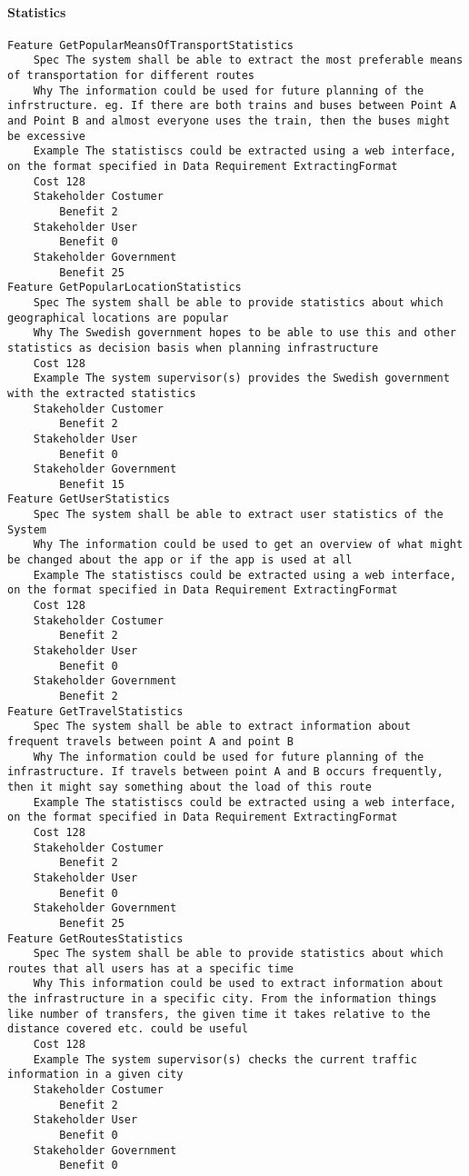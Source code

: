 \begin{lstlisting}

\end{lstlisting}


			 \paragraph{Statistics}


\begin{lstlisting}
Feature GetPopularMeansOfTransportStatistics
	Spec The system shall be able to extract the most preferable means of transportation for different routes
	Why The information could be used for future planning of the infrstructure. eg. If there are both trains and buses between Point A and Point B and almost everyone uses the train, then the buses might be excessive
	Example The statistiscs could be extracted using a web interface, on the format specified in Data Requirement ExtractingFormat
	Cost 128
	Stakeholder Costumer
		Benefit 2
	Stakeholder User
		Benefit 0
	Stakeholder Government
		Benefit 25
Feature GetPopularLocationStatistics
	Spec The system shall be able to provide statistics about which geographical locations are popular
	Why The Swedish government hopes to be able to use this and other statistics as decision basis when planning infrastructure
	Cost 128
	Example The system supervisor(s) provides the Swedish government with the extracted statistics
	Stakeholder Customer
		Benefit 2
	Stakeholder User
		Benefit 0
	Stakeholder Government
		Benefit 15
Feature GetUserStatistics
	Spec The system shall be able to extract user statistics of the System
	Why The information could be used to get an overview of what might be changed about the app or if the app is used at all
	Example The statistiscs could be extracted using a web interface, on the format specified in Data Requirement ExtractingFormat
	Cost 128
	Stakeholder Costumer
		Benefit 2
	Stakeholder User
		Benefit 0
	Stakeholder Government
		Benefit 2
Feature GetTravelStatistics
	Spec The system shall be able to extract information about frequent travels between point A and point B
	Why The information could be used for future planning of the infrastructure. If travels between point A and B occurs frequently, then it might say something about the load of this route
	Example The statistiscs could be extracted using a web interface, on the format specified in Data Requirement ExtractingFormat
	Cost 128
	Stakeholder Costumer
		Benefit 2
	Stakeholder User
		Benefit 0
	Stakeholder Government
		Benefit 25
Feature GetRoutesStatistics
	Spec The system shall be able to provide statistics about which routes that all users has at a specific time
	Why This information could be used to extract information about the infrastructure in a specific city. From the information things like number of transfers, the given time it takes relative to the distance covered etc. could be useful
	Cost 128
	Example The system supervisor(s) checks the current traffic information in a given city
	Stakeholder Costumer
		Benefit 2
	Stakeholder User
		Benefit 0
	Stakeholder Government
		Benefit 0

\end{lstlisting}
		
